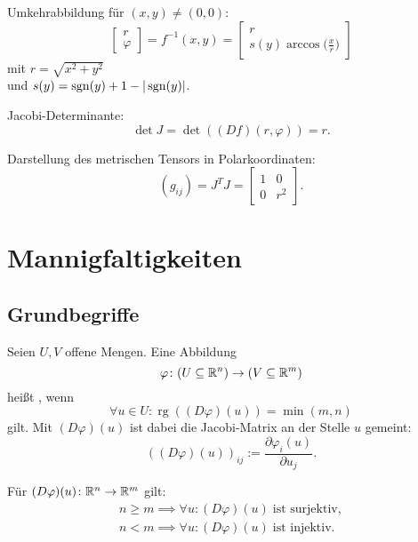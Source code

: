 Umkehrabbildung für $(x,y)\ne (0,0)$:
\begin{equation}
\begin{bmatrix}r\\ \varphi\end{bmatrix}
= f^{-1}(x,y)
= \begin{bmatrix}
r\\
\displaystyle s(y)\arccos\Big(\frac{x}{r}\Big)
\end{bmatrix}
\end{equation}
mit $r=\sqrt{x^2+y^2}$\\
und $s(y)=\operatorname*{sgn}(y)+1-|\operatorname*{sgn}(y)|$.

Jacobi-Determinante:
\begin{equation}
\det J = \det((Df)(r,\varphi)) =r.
\end{equation}

\pagebreak[3]\noindent
Darstellung des metrischen Tensors in Polarkoordinaten:%
\begin{equation}
(g_{ij}) = J^T J = \begin{bmatrix}
1 & 0\\
0 & r^2
\end{bmatrix}.
\end{equation}

\section{Mannigfaltigkeiten}
\subsection{Grundbegriffe}

\begin{definition}
Seien $U,V$ offene Mengen. Eine Abbildung
\begin{equation}
\varphi\colon (U\subseteq\mathbb R^n)\to (V\subseteq\mathbb R^m)
\end{equation}
heißt , wenn
\begin{equation}
\forall u\in U\colon \operatorname{rg}((D\varphi)(u))=\min(m,n)
\end{equation}
gilt. Mit $(D\varphi)(u)$ ist dabei die Jacobi-Matrix an der Stelle
$u$ gemeint:
\begin{equation}
((D\varphi)(u))_{ij} := \frac{\partial\varphi_i(u)}{\partial u_j}.
\end{equation}
\end{definition}
\noindent
Für $(D\varphi)(u)\colon\mathbb R^n\to\mathbb R^m$ gilt:
\begin{gather}
n{\ge}m\implies\forall u\colon (D\varphi)(u)\;\text{ist surjektiv},\\
n{<}m\implies\forall u\colon (D\varphi)(u)\;\text{ist injektiv}.
\end{gather}

